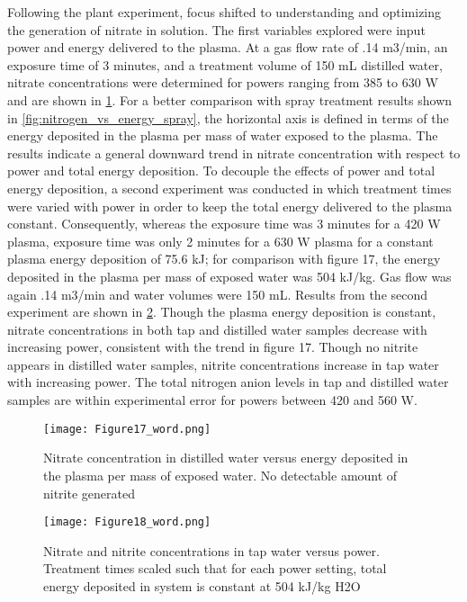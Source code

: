 Following the plant experiment, focus shifted to understanding and optimizing the generation of nitrate in solution.  The first variables explored were input power and energy delivered to the plasma.  At a gas flow rate of .14 m3/min, an exposure time of 3 minutes, and a treatment volume of 150 mL distilled water, nitrate concentrations were determined for powers ranging from 385 to 630 W and are shown in \cref{fig:nitrogen_vs_energy}.  For a better comparison with spray treatment results shown in \cref{fig:nitrogen_vs_energy_spray}, the horizontal axis is defined in terms of the energy deposited in the plasma per mass of water exposed to the plasma.  The results indicate a general downward trend in nitrate concentration with respect to power and total energy deposition.   To decouple the effects of power and total energy deposition, a second experiment was conducted in which treatment times were varied with power in order to keep the total energy delivered to the plasma constant.  Consequently, whereas the exposure time was 3 minutes for a 420 W plasma, exposure time was only 2 minutes for a 630 W plasma for a constant plasma energy deposition of 75.6 kJ; for comparison with figure 17, the energy deposited in the plasma per mass of exposed water was 504 kJ/kg.  Gas flow was again .14 m3/min and water volumes were 150 mL.  Results from the second experiment are shown in \cref{fig:nitrogen_vs_power}.  Though the plasma energy deposition is constant, nitrate concentrations in both tap and distilled water samples decrease with increasing power, consistent with the trend in figure 17.  Though no nitrite appears in distilled water samples, nitrite concentrations increase in tap water with increasing power.  The total nitrogen anion levels in tap and distilled water samples are within experimental error for powers between 420 and 560 W.

\begin{figure}[htbp]
  \centering
  \texttt{[image: Figure17\_word.png]}
  \caption{Nitrate concentration in distilled water versus energy deposited in the plasma per mass of exposed water. No detectable amount of nitrite generated}
  \label{fig:nitrogen_vs_energy}
\end{figure}

\begin{figure}[htbp]
  \centering
  \texttt{[image: Figure18\_word.png]}
  \caption{Nitrate and nitrite concentrations in tap water versus power.  Treatment times scaled such that for each power setting, total energy deposited in system is constant at 504 kJ/kg H2O}
  \label{fig:nitrogen_vs_power}
\end{figure}

